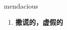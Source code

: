 
\begin{frame}
{\huge mendacious}
\begin{center}
\begin{enumerate}\Large
  \item \textbf{撒谎的，虚假的}
\end{enumerate}
\end{center}
\end{frame}
